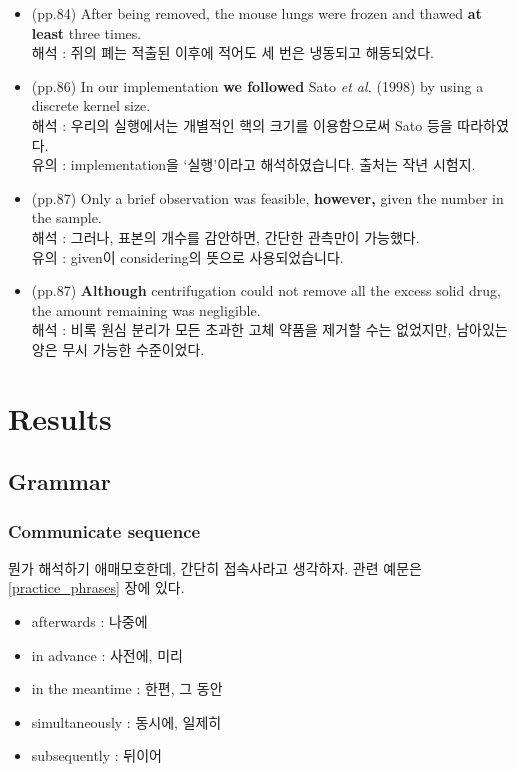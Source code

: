 \documentclass[10pt]{report}
\begin{document}
\begin{itemize}
		\item (pp.84) After being removed, the mouse lungs were frozen and thawed {\bf at least} three times. \\
		해석 : 쥐의 폐는 적출된 이후에 적어도 세 번은 냉동되고 해동되었다.
		\item (pp.86) In our implementation {\bf we followed} Sato {\it et al.} (1998) by using a discrete kernel size. \\
		해석 : 우리의 실행에서는 개별적인 핵의 크기를 이용함으로써 Sato 등을 따라하였다. \\
		유의 : implementation을 `실행'이라고 해석하였습니다. 출처는 작년 시험지.
		\item (pp.87) Only a brief observation was feasible, {\bf however,} given the number in the sample. \\
		해석 : 그러나, 표본의 개수를 감안하면, 간단한 관측만이 가능했다. \\
		유의 : given이 considering의 뜻으로 사용되었습니다.
		\item (pp.87) {\bf Although} centrifugation could not remove all the excess solid drug, the amount remaining was negligible. \\
		해석 : 비록 원심 분리가 모든 초과한 고체 약품을 제거할 수는 없었지만, 남아있는 양은 무시 가능한 수준이었다.
	\end{itemize}
	
	\chapter{Results}
	
	\section{Grammar}
	
	\subsection{Communicate sequence}
	뭔가 해석하기 애매모호한데, 간단히 접속사라고 생각하자. 관련 예문은 \ref{practice_phrases} 장에 있다.
	\begin{itemize}
		\item afterwards : 나중에
		\item in advance : 사전에, 미리
		\item in the meantime : 한편, 그 동안
		\item simultaneously : 동시에, 일제히
		\item subsequently : 뒤이어
	\end{itemize}
	
\end{document}

